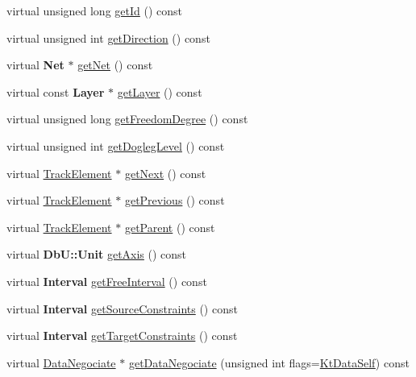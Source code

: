 \begin{DoxyCompactItemize}
\item 
virtual unsigned long \mbox{\hyperlink{classKite_1_1TrackSegment_afdedcef127ad2a3677a5b48d7d3453f3}{get\+Id}} () const
\item 
virtual unsigned int \mbox{\hyperlink{classKite_1_1TrackSegment_a0dd7cf705ace42c662c289955313b2e9}{get\+Direction}} () const
\item 
virtual \textbf{ Net} $\ast$ \mbox{\hyperlink{classKite_1_1TrackSegment_a692492374623a5c6096b2c4a51190359}{get\+Net}} () const
\item 
virtual const \textbf{ Layer} $\ast$ \mbox{\hyperlink{classKite_1_1TrackSegment_ab045567c4f529dca7790d66c17c3084f}{get\+Layer}} () const
\item 
virtual unsigned long \mbox{\hyperlink{classKite_1_1TrackSegment_aa7552c20cc46abcac558627b2ca341f8}{get\+Freedom\+Degree}} () const
\item 
virtual unsigned int \mbox{\hyperlink{classKite_1_1TrackSegment_add78c6f914788c549f144998caacda84}{get\+Dogleg\+Level}} () const
\item 
virtual \mbox{\hyperlink{classKite_1_1TrackElement}{Track\+Element}} $\ast$ \mbox{\hyperlink{classKite_1_1TrackSegment_a010b7fc8801c5b88aefa4137cf85186d}{get\+Next}} () const
\item 
virtual \mbox{\hyperlink{classKite_1_1TrackElement}{Track\+Element}} $\ast$ \mbox{\hyperlink{classKite_1_1TrackSegment_a55d6115d84c11ad147f4c38fe372ea24}{get\+Previous}} () const
\item 
virtual \mbox{\hyperlink{classKite_1_1TrackElement}{Track\+Element}} $\ast$ \mbox{\hyperlink{classKite_1_1TrackSegment_a95ec3b8e7e1ec87c20ee0b37bcc96df7}{get\+Parent}} () const
\item 
virtual \textbf{ Db\+U\+::\+Unit} \mbox{\hyperlink{classKite_1_1TrackSegment_ab5b5aaa5b318369feee6003dbad039c2}{get\+Axis}} () const
\item 
virtual \textbf{ Interval} \mbox{\hyperlink{classKite_1_1TrackSegment_a034711e2d3617ea848ef9f5a18255e10}{get\+Free\+Interval}} () const
\item 
virtual \textbf{ Interval} \mbox{\hyperlink{classKite_1_1TrackSegment_a48f8b54f9489da3778d85c382a483f81}{get\+Source\+Constraints}} () const
\item 
virtual \textbf{ Interval} \mbox{\hyperlink{classKite_1_1TrackSegment_a69af7d4287bc0e44c9ca2c8e6f692be9}{get\+Target\+Constraints}} () const
\item 
virtual \mbox{\hyperlink{classKite_1_1DataNegociate}{Data\+Negociate}} $\ast$ \mbox{\hyperlink{classKite_1_1TrackSegment_acd0170a05128ec4af16ecd0060c3a3b5}{get\+Data\+Negociate}} (unsigned int flags=\mbox{\hyperlink{namespaceKite_acca8fffa3182dea5f94208f454f14b47a68e917ff37d4b5cef906303181836404}{Kt\+Data\+Self}}) const

\end{DoxyCompactItemize}
